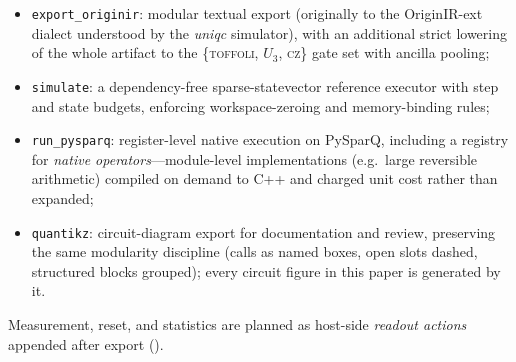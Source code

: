 \begin{itemize}
\item \texttt{export\_originir}: modular textual export (originally to the
  OriginIR-ext dialect understood by the \emph{uniqc} simulator), with an
  additional strict lowering of the whole artifact to the
  \{\textsc{toffoli}, $U_3$, \textsc{cz}\} gate set with ancilla pooling;
\item \texttt{simulate}: a dependency-free sparse-statevector reference
  executor with step and state budgets, enforcing workspace-zeroing and
  memory-binding rules;
\item \texttt{run\_pysparq}: register-level native execution on PySparQ,
  including a registry for \emph{native operators}---module-level
  implementations (e.g.\ large reversible arithmetic) compiled on demand to
  C++ and charged unit cost rather than expanded;
\item \texttt{quantikz}: circuit-diagram export for documentation and
  review, preserving the same modularity discipline (calls as named boxes,
  open slots dashed, structured blocks grouped); every circuit figure in
  this paper is generated by it.
\end{itemize}

Measurement, reset, and statistics are planned as host-side
\emph{readout actions} appended after export ().

